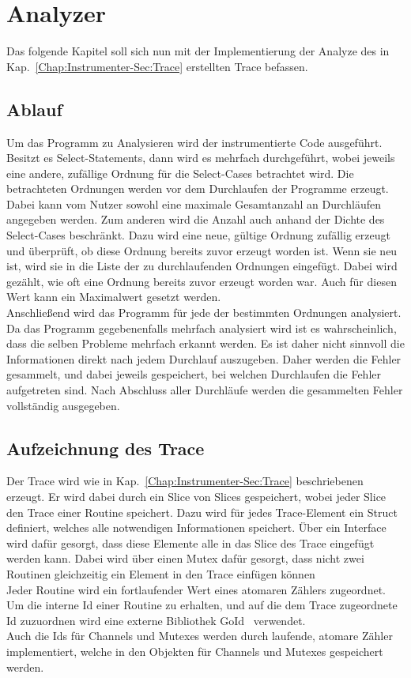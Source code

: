 
\chapter{Analyzer} \label{Chap:Implement}

Das folgende Kapitel soll sich nun mit der Implementierung der Analyze des in 
Kap.~\ref{Chap:Instrumenter-Sec:Trace} erstellten 
Trace befassen.

\section{Ablauf}
Um das Programm zu Analysieren wird der instrumentierte Code ausgeführt.
Besitzt es Select-Statements, dann wird es mehrfach durchgeführt, 
wobei jeweils eine andere, zufällige Ordnung für die Select-Cases 
betrachtet wird. Die betrachteten Ordnungen werden vor dem Durchlaufen 
der Programme erzeugt. Dabei kann vom Nutzer sowohl eine maximale 
Gesamtanzahl an Durchläufen angegeben werden. Zum anderen wird die 
Anzahl auch anhand der Dichte des Select-Cases beschränkt. Dazu wird 
eine neue, gültige Ordnung zufällig erzeugt und überprüft, ob diese 
Ordnung bereits zuvor erzeugt worden ist. Wenn sie neu ist, wird sie in 
die Liste der zu durchlaufenden Ordnungen eingefügt. Dabei wird gezählt,
wie oft eine Ordnung bereits zuvor erzeugt worden war. Auch für diesen 
Wert kann ein Maximalwert gesetzt werden.\\
Anschließend wird das Programm für jede der bestimmten Ordnungen analysiert.
Da das Programm gegebenenfalls mehrfach analysiert wird ist es wahrscheinlich, dass 
die selben Probleme mehrfach erkannt werden. Es ist daher nicht sinnvoll 
die Informationen direkt nach jedem Durchlauf auszugeben. Daher werden die 
Fehler gesammelt, und dabei jeweils gespeichert, bei welchen Durchlaufen die 
Fehler aufgetreten sind. Nach Abschluss aller Durchläufe werden die 
gesammelten Fehler vollständig ausgegeben.

\section{Aufzeichnung des Trace}
Der Trace wird wie in Kap.~\ref{Chap:Instrumenter-Sec:Trace}
beschriebenen erzeugt. Er wird dabei durch ein Slice von Slices 
gespeichert, wobei jeder Slice den Trace einer Routine 
speichert. Dazu wird für jedes Trace-Element ein Struct definiert, 
welches alle notwendigen Informationen speichert. Über ein Interface 
wird dafür gesorgt, dass diese Elemente alle in das Slice des Trace eingefügt
werden kann. Dabei wird über einen Mutex dafür gesorgt, dass nicht 
zwei Routinen gleichzeitig ein Element in den Trace einfügen können\\
Jeder Routine wird ein fortlaufender Wert eines atomaren Zählers zugeordnet. 
Um die interne Id einer Routine zu erhalten, und auf die dem Trace zugeordnete 
Id zuzuordnen wird eine externe Bibliothek GoId~\cite{goid} verwendet.\\
Auch die Ids für Channels und Mutexes werden durch laufende, atomare Zähler 
implementiert, welche in den Objekten für Channels und Mutexes gespeichert werden.

